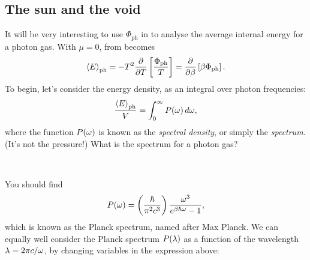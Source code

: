 \subsection{\label{sec:planck}The sun and the void}
It will be very interesting to use $\Phi_{\text{ph}}$ in  to analyse the average internal energy for a photon gas.
With $\mu = 0$,  from  becomes
\begin{equation*}
  \left\langle E \right\rangle_{\text{ph}} = -T^2 \frac{\partial }{\partial T} \left[\frac{\Phi_{\text{ph}}}{T}\right] = \frac{\partial }{\partial \beta} \left[\beta \Phi_{\text{ph}}\right].
\end{equation*}
To begin, let's consider the energy density, as an integral over photon frequencies:
\begin{equation*}
  \frac{\left\langle E \right\rangle_{\text{ph}}}{V} = \int_0^{\infty} P(\omega) \mathop{d\omega},
\end{equation*}
where the function $P(\omega)$ is known as the \textit{spectral density}, or simply the \textit{spectrum}.
(It's not the pressure!)
What is the spectrum for a photon gas?
\begin{mdframed}
  \ \\[150 pt]
\end{mdframed}

You should find
\begin{equation}
  \label{eq:Planck_omega}
  P(\omega) = \left(\frac{\hbar}{\pi^2 c^3}\right) \frac{\omega^3}{e^{\beta \hbar \omega} - 1},
\end{equation}
which is known as the Planck spectrum, named after Max Planck.
We can equally well consider the Planck spectrum $P(\lambda)$ as a function of the wavelength $\lambda = 2\pi c / \omega$, by changing variables in the expression above:
\begin{mdframed}
  \ \\[150 pt]
\end{mdframed}

